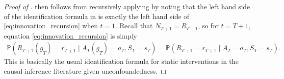 \documentclass[12pt,a4paper]{article}
\theoremstyle{definition}
\newcommand{\PP}[0]{\mathbb{P}}
\begin{document}
\begin{proof}[Proof of
  ]

 then follows from recursively applying
 by noting that the left hand side of the
identification formula in  is exactly the
left hand side of \eqref{eq:innovation_recursion} when $t = 1$. Recall
that $N_{T+1} = R_{T+1}$, so for $t = T+1$, equation
\eqref{eq:innovation_recursion} is simply
\begin{align*}
    \mathbb{P}(R_{T+1}(\underline{g}_T) = r_{T+1} \mid A_T(\underline{g}_{T}) = a_T, S_{T} = s_{T}) = \mathbb{P}(R_{T+1} = r_{T+1} \mid A_{T} = a_T, S_T = s_T).
\end{align*}
This is basically the usual identification formula for static
interventions in the causal inference literature given
unconfoundedness.
  \end{proof}


\end{document}
